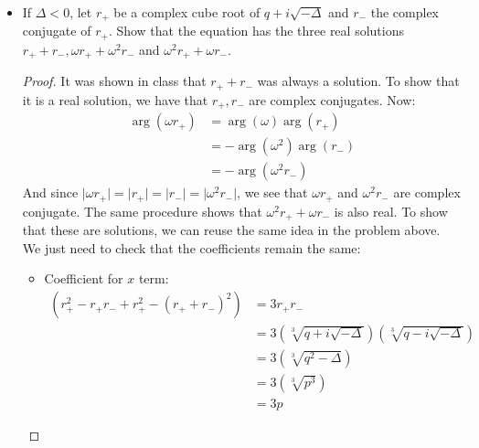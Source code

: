 \documentclass{article}
\begin{document}
\begin{itemize}
        \item If $\Delta < 0$, let $r_{+}$ be a complex cube root of $q + i \sqrt{ -\Delta}$ and $r_{-}$ the complex conjugate of $r_{+}$. Show that the equation has the three real solutions $r_{+} + r_{-}, \omega r_{+} + \omega^{2}r_{-}$ and $\omega^{2}r_{+} + \omega r_{-}$. 
            \begin{proof}
                It was shown in class that $r_{+} + r_{-}$ was always a solution. To show that it is a real solution, we have that $r_{+}, r_{-}$ are complex conjugates. Now:
                    \begin{align*}
                        \mathop{arg}(\omega r_{+}) &= \mathop{arg}(\omega)\mathop{arg}(r_{+})      \\
                                                   &= -\mathop{arg}(\omega^{2})\mathop{arg}(r_{-}) \\
                                                   &= -\mathop{arg}(\omega^{2} r_{-})                
                    \end{align*}
                And since $\lvert \omega r_{+} \rvert = \lvert r_{+} \rvert = \lvert r_{-} \rvert = \lvert \omega^{2} r_{-} \rvert$, we see that $\omega r_{+}$ and $\omega^{2} r_{-}$ are complex conjugate. The same procedure shows that $\omega^{2} r_{+} + \omega r_{-}$ is also real. To show that these are solutions, we can reuse the same idea in the problem above. We just need to check that the coefficients remain the same:
                    \begin{itemize}
                        \item Coefficient for $x$ term:
                            \begin{align*}
                                (r_{+}^{2} - r_{+}r_{-} + r_{+}^{2} - (r_{+} + r_{-})^{2}) &= 3r_{+}r_{-}                                                      \\
                                                                                           &= 3(\sqrt[3]{q + i \sqrt{-\Delta}})(\sqrt[3]{q - i\sqrt{-\Delta}}) \\
                                                                                           &= 3(\sqrt[3]{q^{2} - \Delta})                                      \\
                                                                                           &= 3(\sqrt[3]{p^{3}})                                               \\
                                                                                           &= 3p                                                                 
                            \end{align*}


\end{itemize}
\end{proof}
\end{itemize}
\end{document}

